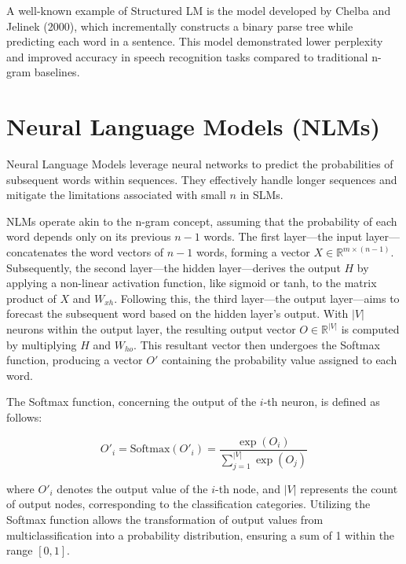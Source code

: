 A well-known example of Structured LM is the model developed by Chelba and Jelinek (2000), which incrementally constructs a binary parse tree while predicting each word in a sentence. This model demonstrated lower perplexity and improved accuracy in speech recognition tasks compared to traditional n-gram baselines.

\section{Neural Language Models (NLMs)}

Neural Language Models leverage neural networks to predict the probabilities of subsequent words within sequences. They effectively handle longer sequences and mitigate the limitations associated with small $n$ in SLMs. 

NLMs operate akin to the n-gram concept, assuming that the probability of each word depends only on its previous $n-1$ words. The first layer—the input layer—concatenates the word vectors of $n-1$ words, forming a vector $X \in \mathbb{R}^{m \times (n-1)}$. Subsequently, the second layer—the hidden layer—derives the output $H$ by applying a non-linear activation function, like sigmoid or tanh, to the matrix product of $X$ and $W_{xh}$. Following this, the third layer—the output layer—aims to forecast the subsequent word based on the hidden layer’s output. With $|V|$ neurons within the output layer, the resulting output vector $O \in \mathbb{R}^{|V|}$ is computed by multiplying $H$ and $W_{ho}$. This resultant vector then undergoes the Softmax function, producing a vector $O'$ containing the probability value assigned to each word.

The Softmax function, concerning the output of the $i$-th neuron, is defined as follows:

\begin{equation}
    O'_i = \text{Softmax}(O'_i) = \frac{\exp(O_i)}{\sum_{j=1}^{|V|} \exp(O_j)}
\end{equation}

\noindent where $O'_i$ denotes the output value of the $i$-th node, and $|V|$ represents the count of output nodes, corresponding to the classification categories. Utilizing the Softmax function allows the transformation of output values from multiclassification into a probability distribution, ensuring a sum of 1 within the range $[0, 1]$.

